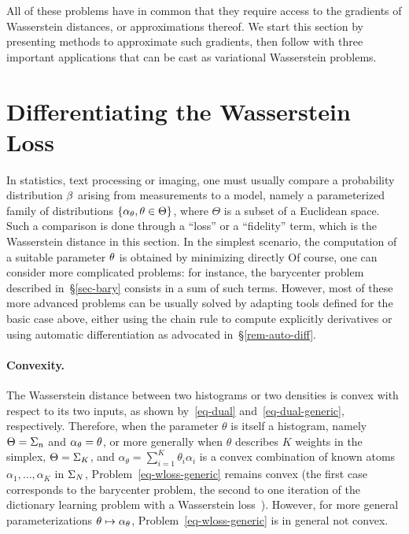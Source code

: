 All of these problems have in common that they require access to the gradients of Wasserstein distances, or approximations thereof. We start this section by presenting methods to approximate such gradients, then follow with three important applications that can be cast as variational Wasserstein problems.

\section{Differentiating the Wasserstein Loss}

In statistics, text processing or imaging, one must usually compare a probability distribution $\beta$ arising from measurements to a model, namely a parameterized family of distributions $\{\alpha_\theta,\theta\in\Theta\}$, where $\Theta$ is a subset of a Euclidean space. Such a comparison is done through a ``loss'' or a ``fidelity'' term, which is the Wasserstein distance in this section.
%
In the simplest scenario, the computation of a suitable parameter $\theta$ is obtained by minimizing directly
Of course, one can consider more complicated problems: for instance, the barycenter problem described in~\S\ref{sec-bary} consists in a sum of such terms. However, most of these more advanced problems can be usually solved by adapting tools defined for the basic case above, either using the chain rule to compute explicitly derivatives or using automatic differentiation as advocated in~\S\ref{rem-auto-diff}. 

\paragraph{Convexity.} The Wasserstein distance between two histograms or two densities is convex with respect to its two inputs, as shown by~\eqref{eq-dual} and~\eqref{eq-dual-generic}, respectively. Therefore, when the parameter $\theta$ is itself a histogram, namely $\Theta=\Sigma_n$ and $\alpha_\theta=\theta$, or more generally when $\theta$ describes $K$ weights in the simplex, $\Theta=\Sigma_K$, and $\alpha_\theta=\sum_{i=1}^K \theta_i \alpha_i$ is a convex combination of known atoms $\alpha_1,\dots,\alpha_K$ in $\Sigma_N$, Problem~\eqref{eq-wloss-generic} remains convex (the first case corresponds to the barycenter problem, the second to one iteration of the dictionary learning problem with a Wasserstein loss~\citep{pmlr-v51-rolet16}). However, for more general parameterizations $\theta\mapsto \alpha_\theta$, Problem~\eqref{eq-wloss-generic} is in general not convex.


